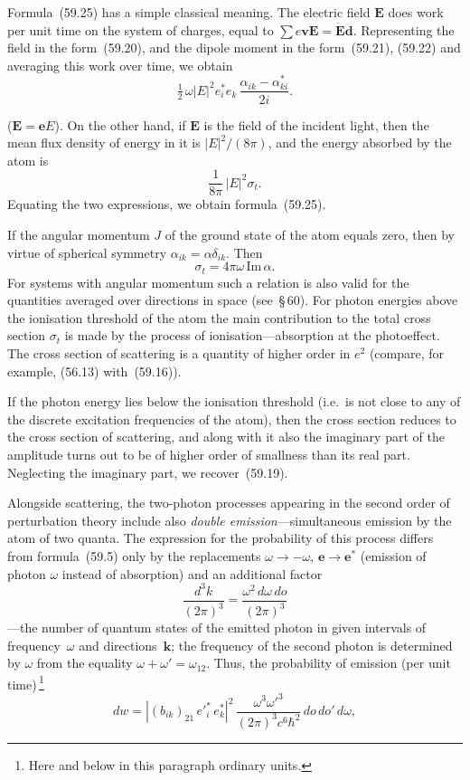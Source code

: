 Formula~(59.25) has a simple classical meaning. The electric field $\mathbf{E}$ does work per unit time on the system of charges, equal to $\sum e\mathbf{v}\mathbf{E} = \dot{\mathbf{E}}\mathbf{d}$. Representing the field in the form~(59.20), and the dipole moment in the form~(59.21), (59.22) and averaging this work over time, we obtain
\[
\tfrac{1}{2}\,\omega|E|^2 e^*_i e_k\,\frac{\alpha_{ik} - \alpha^*_{ki}}{2i}.
\]

($\mathbf{E} = \mathbf{e}E$). On the other hand, if $\mathbf{E}$ is the field of the incident light, then the mean flux density of energy in it is $|E|^2/(8\pi)$, and the energy absorbed by the atom is
\[
\frac{1}{8\pi}\,|E|^2\sigma_t.
\]
Equating the two expressions, we obtain formula~(59.25).

If the angular momentum $J$ of the ground state of the atom equals zero, then by virtue of spherical symmetry $\alpha_{ik} = \alpha\delta_{ik}$. Then
\begin{equation}
\sigma_t = 4\pi\omega\,\mathrm{Im}\,\alpha.
\tag{59.26}
\end{equation}
For systems with angular momentum such a relation is also valid for the quantities averaged over directions in space (see~\S\,60). For photon energies above the ionisation threshold of the atom the main contribution to the total cross section $\sigma_t$ is made by the process of ionisation---absorption at the photoeffect. The cross section of scattering is a quantity of higher order in $e^2$ (compare, for example, (56.13) with~(59.16)).

If the photon energy lies below the ionisation threshold (i.e.\ is not close to any of the discrete excitation frequencies of the atom), then the cross section reduces to the cross section of scattering, and along with it also the imaginary part of the amplitude turns out to be of higher order of smallness than its real part. Neglecting the imaginary part, we recover~(59.19).

Alongside scattering, the two-photon processes appearing in the second order of perturbation theory include also \textit{double emission}---simultaneous emission by the atom of two quanta. The expression for the probability of this process differs from formula~(59.5) only by the replacements $\omega \to -\omega$, $\mathbf{e} \to \mathbf{e}^*$ (emission of photon $\omega$ instead of absorption) and an additional factor
\[
\frac{d^3k}{(2\pi)^3} = \frac{\omega^2\,d\omega\,do}{(2\pi)^3}
\]
---the number of quantum states of the emitted photon in given intervals of frequency~$\omega$ and directions~$\mathbf{k}$; the frequency of the second photon is determined by $\omega$ from the equality $\omega + \omega' = \omega_{12}$. Thus, the probability of emission (per unit time)\,\footnote{Here and below in this paragraph ordinary units.}
\begin{equation}
dw = |(b_{ik})_{21}\,e'^*_i\,e^*_k|^2\,\frac{\omega^3\omega'^3}{(2\pi)^3c^6\hbar^2}\,do\,do'\,d\omega,
\tag{59.27}
\end{equation}

